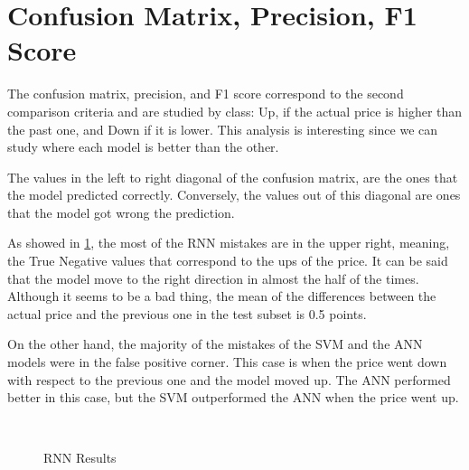 \section{Confusion Matrix, Precision, F1 Score}

The confusion matrix, precision, and F1 score correspond to the second comparison criteria and are studied by class: Up, if the actual price is higher than the past one, and Down if it is lower. This analysis is interesting since we can study where each model is better than the other. 

The values in the left to right diagonal of the confusion matrix, are the ones that the model predicted correctly. Conversely, the values out of this diagonal are ones that the model got wrong the prediction.

As showed in \ref{fig:resultsRNN}, the most of the RNN mistakes are in the upper right, meaning, the True Negative values that correspond to the ups of the price. It can be said that the model move to the right direction in almost the half of the times. Although it seems to be a bad thing, the mean of the differences between the actual price and the previous one in the test subset is 0.5 points. 

On the other hand, the majority of the mistakes of the SVM and the ANN models were in the false positive corner. This case is when the price went down with respect to the previous one and the model moved up. The ANN performed better in this case, but the SVM outperformed the ANN when the price went up.

\begin{figure}
\center
{} 
\\
\caption{RNN Results}
\label{fig:resultsRNN}
\end{figure}

